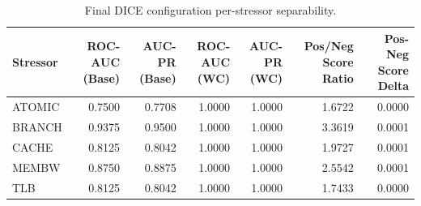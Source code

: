 \begin{table}[t]
\centering
\caption{Final DICE configuration per-stressor separability.}
\label{tab:dice_full_stressor}
\footnotesize
\begin{tabular}{lrrrrrr}
\toprule
Stressor & ROC-AUC (Base) & AUC-PR (Base) & ROC-AUC (WC) & AUC-PR (WC) & Pos/Neg Score Ratio & Pos-Neg Score Delta \\
\midrule
ATOMIC & 0.7500 & 0.7708 & 1.0000 & 1.0000 & 1.6722 & 0.0000 \\
BRANCH & 0.9375 & 0.9500 & 1.0000 & 1.0000 & 3.3619 & 0.0001 \\
CACHE & 0.8125 & 0.8042 & 1.0000 & 1.0000 & 1.9727 & 0.0001 \\
MEMBW & 0.8750 & 0.8875 & 1.0000 & 1.0000 & 2.5542 & 0.0001 \\
TLB & 0.8125 & 0.8042 & 1.0000 & 1.0000 & 1.7433 & 0.0000 \\
\bottomrule
\end{tabular}

\end{table}
